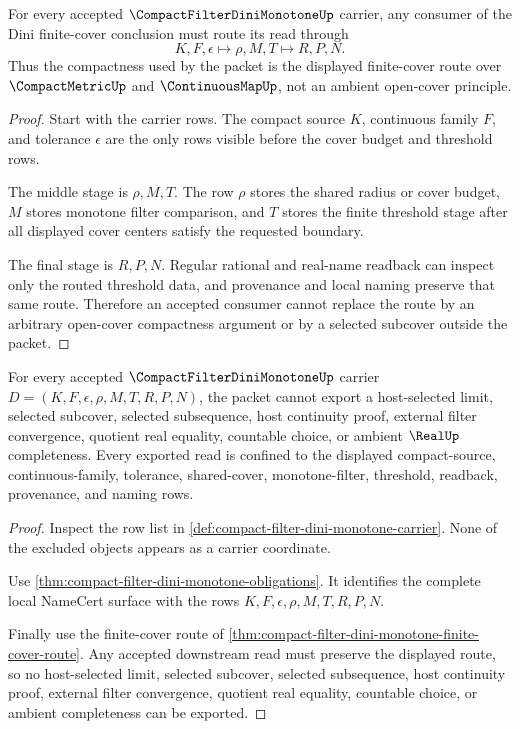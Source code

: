 \begin{theorem}
\label{thm:compact-filter-dini-monotone-finite-cover-route}
For every accepted $\CompactFilterDiniMonotoneUp$ carrier, any consumer of the Dini finite-cover conclusion must route its read through
$$
K,F,\epsilon \longmapsto \rho,M,T \longmapsto R,P,N .
$$
Thus the compactness used by the packet is the displayed finite-cover route over $\CompactMetricUp$ and $\ContinuousMapUp$, not an ambient open-cover principle.
\end{theorem}
\begin{proof}
Start with the carrier rows. The compact source $K$, continuous family $F$, and tolerance $\epsilon$ are the only rows visible before the cover budget and threshold rows.

The middle stage is $\rho,M,T$. The row $\rho$ stores the shared radius or cover budget, $M$ stores monotone filter comparison, and $T$ stores the finite threshold stage after all displayed cover centers satisfy the requested boundary.

The final stage is $R,P,N$. Regular rational and real-name readback can inspect only the routed threshold data, and provenance and local naming preserve that same route. Therefore an accepted consumer cannot replace the route by an arbitrary open-cover compactness argument or by a selected subcover outside the packet.
\end{proof}

\begin{theorem}
\label{thm:compact-filter-dini-monotone-nonescape}
For every accepted $\CompactFilterDiniMonotoneUp$ carrier $D=(K,F,\epsilon,\rho,M,T,R,P,N)$, the packet cannot export a host-selected limit, selected subcover, selected subsequence, host continuity proof, external filter convergence, quotient real equality, countable choice, or ambient $\RealUp$ completeness. Every exported read is confined to the displayed compact-source, continuous-family, tolerance, shared-cover, monotone-filter, threshold, readback, provenance, and naming rows.
\end{theorem}
\begin{proof}
Inspect the row list in \autoref{def:compact-filter-dini-monotone-carrier}. None of the excluded objects appears as a carrier coordinate.

Use \autoref{thm:compact-filter-dini-monotone-obligations}. It identifies the complete local NameCert surface with the rows $K,F,\epsilon,\rho,M,T,R,P,N$.

Finally use the finite-cover route of \autoref{thm:compact-filter-dini-monotone-finite-cover-route}. Any accepted downstream read must preserve the displayed route, so no host-selected limit, selected subcover, selected subsequence, host continuity proof, external filter convergence, quotient real equality, countable choice, or ambient completeness can be exported.
\end{proof}

